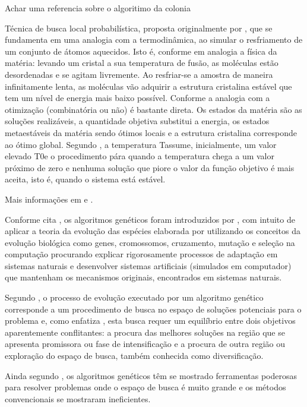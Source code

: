 
	Achar uma referencia sobre o algoritimo da colonia


Técnica de busca local probabilística, proposta originalmente por \cite{kirkpatrick1983optimization}, que se fundamenta em uma analogia com a termodinâmica, ao simular o 
resfriamento de um conjunto de átomos aquecidos. Isto é, conforme \cite{noronha2003abordagem} em 
analogia a física da matéria: levando um cristal a sua temperatura de fusão, as moléculas 
estão desordenadas e se agitam livremente. Ao resfriar-se a amostra de maneira 
infinitamente lenta, as moléculas vão adquirir a estrutura cristalina estável que tem um 
nível de energia mais baixo possível. 
Conforme \cite{aarts1988simulated} a analogia com a otimização (combinatória ou não) 
é bastante direta. Os estados da matéria são as soluções realizáveis, a quantidade objetiva 
substitui a energia, os estados metaestáveis da matéria sendo ótimos locais e a estrutura 
cristalina corresponde ao ótimo global. 
Segundo \cite{reeves1993modern}, a temperatura Tassume, inicialmente, um valor 
elevado T0e o procedimento pára quando a temperatura chega a um valor próximo de zero 
e nenhuma solução que piore o valor da função objetivo é mais aceita, isto é, quando o 
sistema está estável.\par
Mais informações em \cite{reeves1993modern} e \cite{kirkpatrick1983optimization}. 


Conforme cita \cite{oliveira2005algoritmo}, os algoritmos genéticos foram introduzidos 
por \cite{holland1975adaptation}, com intuito de aplicar a teoria da evolução das espécies 
elaborada por \cite{darwin1968origin} utilizando os conceitos da evolução biológica como 
genes, cromossomos, cruzamento, mutação e seleção na computação procurando explicar rigorosamente processos de adaptação em sistemas naturais e desenvolver sistemas artificiais (simulados em computador) que mantenham os mecanismos originais, encontrados em sistemas naturais.\par

Segundo \cite{oliveira2005algoritmo}, o processo de evolução executado por um algoritmo genético corresponde a um procedimento de busca no espaço de soluções potenciais para o problema e, como enfatiza \cite{michalewicz1996evolutionary}, esta busca requer um equilíbrio entre dois objetivos aparentemente conflitantes: a procura das melhores soluções na região que se apresenta promissora ou fase de intensificação e a procura de outra região ou exploração do espaço de busca, também conhecida como diversificação.\par
Ainda segundo \cite{oliveira2005algoritmo}, os algoritmos genéticos têm se mostrado ferramentas poderosas para resolver problemas onde o espaço de busca é muito grande e os métodos convencionais se mostraram ineficientes.\par

